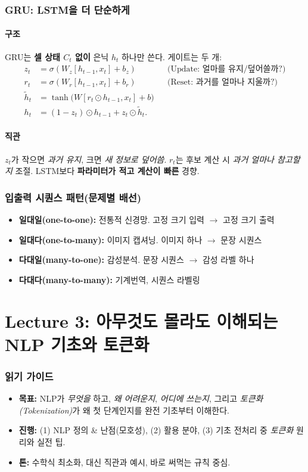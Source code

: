 \documentclass[12pt]{article}
\begin{document}
\section{GRU: LSTM을 더 단순하게}
\subsection{구조}
GRU는 \textbf{셀 상태 $C_t$ 없이} 은닉 $h_t$ 하나만 쓴다. 게이트는 두 개:
\[
\begin{aligned}
z_t &= \sigma(W_z [h_{t-1}, x_t] + b_z) &&\text{(Update: 얼마를 유지/덮어쓸까?)}\\
r_t &= \sigma(W_r [h_{t-1}, x_t] + b_r) &&\text{(Reset: 과거를 얼마나 지울까?)}\\
\tilde{h}_t &= \tanh\!\big(W [r_t\odot h_{t-1}, x_t] + b\big)\\
h_t &= (1-z_t)\odot h_{t-1} + z_t \odot \tilde{h}_t.
\end{aligned}
\]
\subsection*{직관}
$z_t$가 작으면 \emph{과거 유지}, 크면 \emph{새 정보로 덮어씀}. $r_t$는 후보 계산 시 \emph{과거 얼마나 참고할지} 조절. LSTM보다 \textbf{파라미터가 적고 계산이 빠른} 경향.

\section{입출력 시퀀스 패턴(문제별 배선)}
\begin{itemize}
  \item \textbf{일대일(one-to-one):} 전통적 신경망. 고정 크기 입력 $\rightarrow$ 고정 크기 출력
  \item \textbf{일대다(one-to-many):} 이미지 캡셔닝. 이미지 하나 $\rightarrow$ 문장 시퀀스
  \item \textbf{다대일(many-to-one):} 감성분석. 문장 시퀀스 $\rightarrow$ 감성 라벨 하나
  \item \textbf{다대다(many-to-many):} 기계번역, 시퀀스 라벨링
\end{itemize}

\newpage

\part{Lecture 3: 아무것도 몰라도 이해되는 NLP 기초와 토큰화}

\section*{읽기 가이드}
\begin{itemize}[left=0pt]
  \item \textbf{목표:} NLP가 \emph{무엇을} 하고, \emph{왜 어려운지}, \emph{어디에 쓰는지}, 그리고 \emph{토큰화(Tokenization)}가 왜 첫 단계인지를 완전 기초부터 이해한다.
  \item \textbf{진행:} (1) NLP 정의 \& 난점(모호성), (2) 활용 분야, (3) 기초 전처리 중 \emph{토큰화} 원리와 실전 팁.
  \item \textbf{톤:} 수학식 최소화, 대신 직관과 예시, 바로 써먹는 규칙 중심.
\end{itemize}
\end{document}
